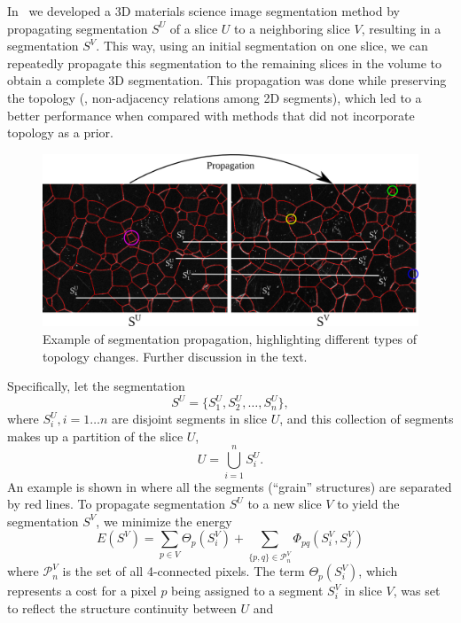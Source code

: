 \documentclass[]{spie}  %
\begin{document}
In~\cite{waggoner:11} we developed a 3D materials science image
segmentation method by propagating segmentation $S^U$ of a slice $U$
to a neighboring slice $V$, resulting in a segmentation $S^V$.  This
way, using an initial segmentation on one slice, we can repeatedly
propagate this segmentation to the remaining slices in the volume to
obtain a complete 3D segmentation.  This propagation was done while
preserving the topology (\ie, non-adjacency relations among 2D
segments), which led to a better performance when compared with
methods that did not incorporate topology as a prior.  %
\begin{figure}[htbp]
\centering
\includegraphics[width=\linewidth]{fig/dd}
\caption{Example of segmentation propagation, highlighting different
  types of topology changes.  Further discussion in the
  text.} \label{fig:full-ex}
\end{figure}
Specifically, let the segmentation
\[S^U = \{ S^U_1, S^U_2, \ldots, S^U_n \} , \]
where $S^U_i , i=1\ldots n$ are disjoint segments in slice $U$, and
this collection of segments makes up a partition of the slice $U$,
\[ U = \bigcup_{i=1}^{n} S^U_i . \] 
An example is shown in  where all the segments (``grain''
structures) are separated by red lines.  To propagate segmentation
$S^U$ to a new slice $V$ to yield the segmentation $S^V$, we minimize
the energy
\begin{equation}
  E( S^V ) = \sum_{p\in V}\Theta_p(S^V_i) + 
  \sum_{\{p,q\}\in\mathcal{P}^V_n} \Phi_{pq}(S_i^V , S_j^V)
\label{eq:energy1}
\end{equation}
where $\mathcal{P}^V_n$ is the set of all 4-connected pixels.  The
\data{} term $\Theta_p(S^V_i)$, which represents a cost for a pixel
$p$ being assigned to a segment $S^V_i$ in slice $V$, was set to
reflect the structure continuity between $U$ and
\end{document}
